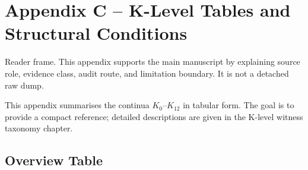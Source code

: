 
\section{Appendix C -- K-Level Tables and Structural Conditions}
Reader frame. This appendix supports the main manuscript by explaining source role, evidence class, audit route, and limitation boundary. It is not a detached raw dump.

\label{app:klevels-tables}

This appendix summarises the continua \(K_0\)–\(K_{12}\) in tabular form.
The goal is to provide a compact reference; detailed descriptions are given in
the K-level witness taxonomy chapter.

\begingroup
\footnotesize
\RaggedRight
\sloppy
\setlength{\tabcolsep}{4pt}

\subsection{Overview Table}

